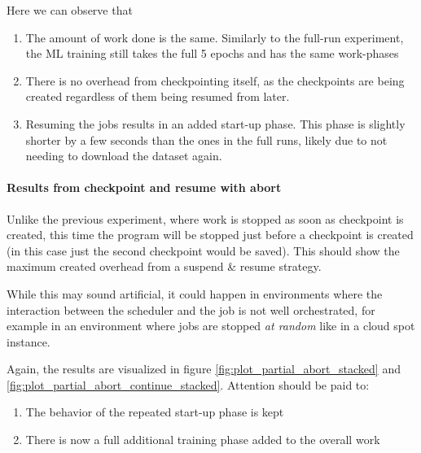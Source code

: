 Here we can observe that

\begin{enumerate}
    \item The amount of work done is the same. 
    Similarly to the full-run experiment, the ML training still takes the full 5 epochs and has the same work-phases
    \item There is no overhead from checkpointing itself, as the checkpoints are being created regardless of them being resumed from later.
    \item Resuming the jobs results in an added start-up phase. This phase is slightly shorter by a few seconds than the ones in the full runs, likely due to not needing to download the dataset again.
\end{enumerate}

\paragraph{Results from checkpoint and resume with abort}

Unlike the previous experiment, where work is stopped as soon as checkpoint is created, this time the program will be stopped just before a checkpoint is created (in this case just the second checkpoint would be saved). 
This should show the maximum created overhead from a suspend \& resume strategy. 

While this may sound artificial, it could happen in environments where the interaction between the scheduler and the job is not well orchestrated, for example in an environment where jobs are stopped \emph{at random} like in a cloud spot instance.

Again, the results are visualized in figure \ref{fig:plot_partial_abort_stacked} and \ref{fig:plot_partial_abort_continue_stacked}. Attention should be paid to:

\begin{enumerate}
    \item The behavior of the repeated start-up phase is kept
    \item There is now a full additional training phase added to the overall work
\end{enumerate}

